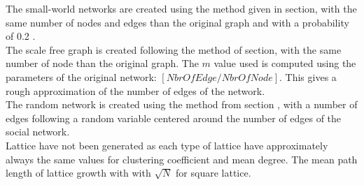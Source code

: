 \documentclass[a4paper, 12pt]{report}
\begin{document}
The small-world networks are created using the method given in section, with the same number of nodes and edges than the original graph and with a probability of 0.2 .\\
The scale free graph is created following the method of section, with the same number of node than the original graph. The $m$ value used is computed using the parameters of the original network: $[NbrOfEdge / NbrOfNode]$. This gives a rough approximation of the number of edges of the network.\\
The random network is created using the method from section , with a number of edges following a random variable centered around the number of edges of the social network.\\
Lattice have not been generated as each type of lattice have approximately always the same values for clustering coefficient and mean degree. The mean path length of lattice growth with with $\sqrt{N}$ for square lattice.


\subsection{}

\listoffigures

\listoftables

 
\end{document}
